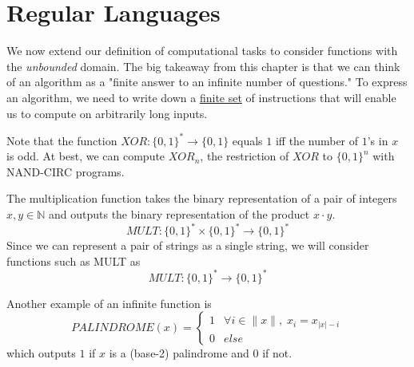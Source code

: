 \section{Regular Languages}  

  We now extend our definition of computational tasks to consider functions with the \textit{unbounded} domain. 
  The big takeaway from this chapter is that we can think of an algorithm as a "finite answer to an infinite number of questions." To express an algorithm, we need to write down a \hyperref[st-def:finite-set]{finite set} of instructions that will enable us to compute on arbitrarily long inputs. 

  \begin{example}
    \label{ex:xor-as-a-parity-function}
    Note that the function $XOR: \{0,1\}^* \to \{0,1\}$ equals $1$ iff the number of $1$'s in $x$ is odd. At best, we can compute $XOR_n$, the restriction of $XOR$ to $\{0,1\}^n$ with NAND-CIRC programs. 
  \end{example}

  \begin{example}
    \label{ex:the-multiplication-function}
    The multiplication function takes the binary representation of a pair of integers $x, y \in \mathbb{N}$ and outputs the binary representation of the product $x \cdot y$. 
    \begin{equation}
      MULT: \{0,1\}^* \times \{0,1\}^* \to \{0,1\}^*
    \end{equation}
    Since we can represent a pair of strings as a single string, we will consider functions such as MULT as
    \begin{equation}
      MULT: \{0,1\}^* \to \{0,1\}^*
    \end{equation}
  \end{example}

  \begin{example}
    \label{ex:palindrome-function}
    Another example of an infinite function is 
    \begin{equation}
      PALINDROME (x) = \begin{cases}
          1 & \forall i \in \|x\|, \; x_i = x_{|x|-i} \\
          0 & else
          \end{cases}
    \end{equation}
    which outputs $1$ if $x$ is a (base-2) palindrome and $0$ if not. 
  \end{example}

